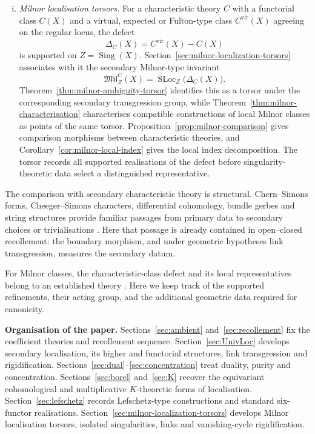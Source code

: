 \documentclass[10pt,a4paper,dvipsnames,x11names]{amsart}
\newcommand{\SLoc}{\operatorname{SLoc}}
\numberwithin{equation}{section}
\theoremstyle{plain}
\theoremstyle{definition}
\theoremstyle{remark}
\begin{document}
\begin{enumerate}[(i)]
\item \emph{Milnor localisation torsors.} For a characteristic theory $C$ with a functorial class $C(X)$ and a virtual, expected or Fulton-type class $C^{\mathrm{vir}}(X)$ agreeing on the regular locus, the defect
\[
\Delta_C(X)=C^{\mathrm{vir}}(X)-C(X)
\]
is supported on $Z=\operatorname{Sing}(X)$. Section~\ref{sec:milnor-localization-torsors} associates with it the secondary Milnor-type invariant
\[
\mathfrak{Mil}_Z^C(X)=\SLoc_Z\bigl(\Delta_C(X)\bigr).
\]
Theorem~\ref{thm:milnor-ambiguity-torsor} identifies this as a torsor under the corresponding secondary transgression group, while Theorem~\ref{thm:milnor-characterisation} characterises compatible constructions of local Milnor classes as points of the same torsor. Proposition~\ref{prop:milnor-comparison} gives comparison morphisms between characteristic theories, and Corollary~\ref{cor:milnor-local-index} gives the local index decomposition. The torsor records all supported realisations of the defect before singularity-theoretic data select a distinguished representative.
\end{enumerate}

The comparison with secondary characteristic theory is structural. Chern--Simons forms, Cheeger--Simons characters, differential cohomology, bundle gerbes and string structures provide familiar passages from primary data to secondary choices or trivialisations \cite{ChernSimons,CheegerSimons,BrylinskiMcLaughlinI,BrylinskiMcLaughlinII,HopkinsSinger,WaldorfString}. Here that passage is already contained in open--closed recollement: the boundary morphism, and under geometric hypotheses link transgression, measures the secondary datum.

For Milnor classes, the characteristic-class defect and its local representatives belong to an established theory \cite{BrasseletSeadeSuwaVectorFields,ParusinskiPragaczJAG,YokuraMotivicMilnor,CappellMaximSchuermannShaneson,MaximSaitoYang,CallejasMorgadoSeadeChernClasses}. Here we keep track of the supported refinements, their acting group, and the additional geometric data required for canonicity.

\medskip
\noindent\textbf{Organisation of the paper.}
Sections~\ref{sec:ambient} and~\ref{sec:recollement} fix the coefficient theories and recollement sequence. Section~\ref{sec:UnivLoc} develops secondary localisation, its higher and functorial structures, link transgression and rigidification. Sections~\ref{sec:dual}--\ref{sec:concentration} treat duality, purity and concentration. Sections~\ref{sec:borel} and~\ref{sec:K} recover the equivariant cohomological and multiplicative $K$-theoretic forms of localisation. Section~\ref{sec:lefschetz} records Lefschetz-type constructions and standard six-functor realisations. Section~\ref{sec:milnor-localization-torsors} develops Milnor localisation torsors, isolated singularities, links and vanishing-cycle rigidification.
\end{document}
